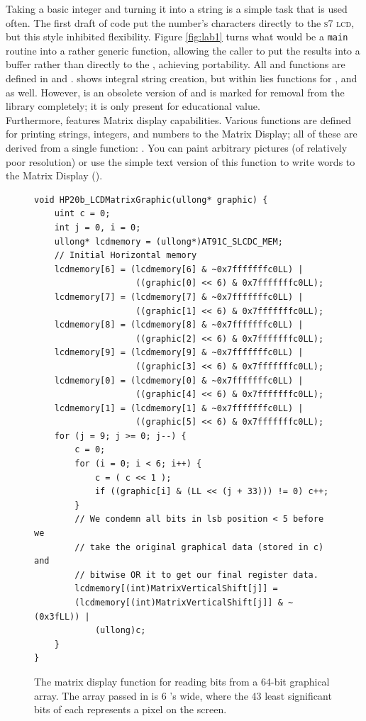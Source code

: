 \documentclass{LibHP20b}
\begin{document}
Taking a basic integer and turning it into a string is a simple task that is used often. The first draft of code put the number's characters directly to the \textsc{s7 lcd}, but this style inhibited flexibility. Figure \ref{fig:lab1} turns what would be a \texttt{main} routine into a rather generic  function, allowing the caller to put the results into a  buffer rather than directly to the \LCD{}, achieving portability. All  and  functions are defined in  and .  shows integral string creation, but within  lies functions for , and  as well. However,  is an obsolete version of  and is marked for removal from the library completely; it is only present for educational value.\\
Furthermore, \HP{} features Matrix display capabilities. Various functions are defined for printing strings, integers, and numbers to the Matrix Display; all of these are derived from a single function: . You can paint arbitrary pictures (of relatively poor resolution) or use the simple text version of this function to write words to the Matrix Display ().

\begin{figure}
\begin{lstlisting}
void HP20b_LCDMatrixGraphic(ullong* graphic) {
	uint c = 0;
	int j = 0, i = 0;
	ullong* lcdmemory = (ullong*)AT91C_SLCDC_MEM;
	// Initial Horizontal memory	
	lcdmemory[6] = (lcdmemory[6] & ~0x7fffffffc0LL) |
					((graphic[0] << 6) & 0x7fffffffc0LL);
	lcdmemory[7] = (lcdmemory[7] & ~0x7fffffffc0LL) |
					((graphic[1] << 6) & 0x7fffffffc0LL);
	lcdmemory[8] = (lcdmemory[8] & ~0x7fffffffc0LL) |
					((graphic[2] << 6) & 0x7fffffffc0LL);
	lcdmemory[9] = (lcdmemory[9] & ~0x7fffffffc0LL) |
					((graphic[3] << 6) & 0x7fffffffc0LL);
	lcdmemory[0] = (lcdmemory[0] & ~0x7fffffffc0LL) |
					((graphic[4] << 6) & 0x7fffffffc0LL);
	lcdmemory[1] = (lcdmemory[1] & ~0x7fffffffc0LL) |
					((graphic[5] << 6) & 0x7fffffffc0LL);
	for (j = 9; j >= 0; j--) {
		c = 0;
		for (i = 0; i < 6; i++) { 
			c = ( c << 1 ); 
			if ((graphic[i] & (LL << (j + 33))) != 0) c++; 
		}
		// We condemn all bits in lsb position < 5 before we
		// take the original graphical data (stored in c) and
		// bitwise OR it to get our final register data.
		lcdmemory[(int)MatrixVerticalShift[j]] =
		(lcdmemory[(int)MatrixVerticalShift[j]] & ~(0x3fLL)) |
			(ullong)c;
	}
}
\end{lstlisting}
\caption{The matrix display function for reading bits from a 64-bit graphical array. The array passed in is 6 's wide, where the 43 least significant bits of each  represents a pixel on the screen. }
\label{fig:lab1matrix}
\end{figure}
\end{document}
